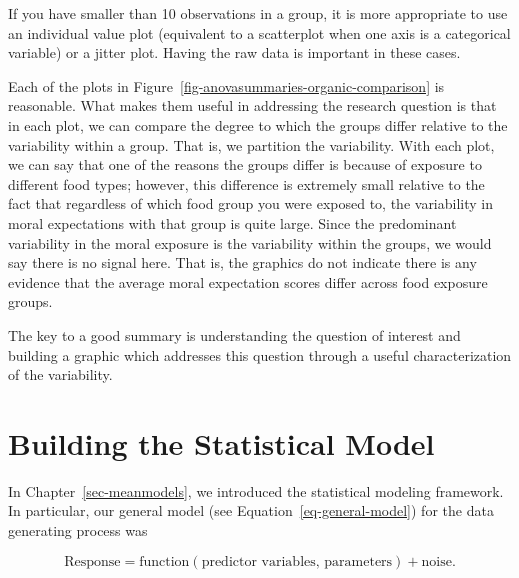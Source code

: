 \documentclass[
  letterpaper,
  DIV=11,
  numbers=noendperiod]{scrreprt}
\theoremstyle{definition}
\theoremstyle{definition}
\theoremstyle{plain}
\theoremstyle{remark}
\begin{document}
\begin{tcolorbox}[enhanced jigsaw, colbacktitle=quarto-callout-warning-color!10!white, colback=white, left=2mm, title=\textcolor{quarto-callout-warning-color}{\faExclamationTriangle}\hspace{0.5em}{Warning}, toptitle=1mm, leftrule=.75mm, breakable, bottomrule=.15mm, arc=.35mm, rightrule=.15mm, toprule=.15mm, coltitle=black, opacityback=0, colframe=quarto-callout-warning-color-frame, opacitybacktitle=0.6, bottomtitle=1mm, titlerule=0mm]

If you have smaller than 10 observations in a group, it is more
appropriate to use an individual value plot (equivalent to a scatterplot
when one axis is a categorical variable) or a jitter plot. Having the
raw data is important in these cases.

\end{tcolorbox}

Each of the plots in Figure~\ref{fig-anovasummaries-organic-comparison}
is reasonable. What makes them useful in addressing the research
question is that in each plot, we can compare the degree to which the
groups differ relative to the variability within a group. That is, we
partition the variability. With each plot, we can say that one of the
reasons the groups differ is because of exposure to different food
types; however, this difference is extremely small relative to the fact
that regardless of which food group you were exposed to, the variability
in moral expectations with that group is quite large. Since the
predominant variability in the moral exposure is the variability within
the groups, we would say there is no signal here. That is, the graphics
do not indicate there is any evidence that the average moral expectation
scores differ across food exposure groups.

The key to a good summary is understanding the question of interest and
building a graphic which addresses this question through a useful
characterization of the variability.

\chapter{Building the Statistical Model}\label{sec-anovamodel}

In Chapter~\ref{sec-meanmodels}, we introduced the statistical modeling
framework. In particular, our general model (see
Equation~\ref{eq-general-model}) for the data generating process was

\[\text{Response} = \text{function}(\text{predictor variables, parameters}) + \text{noise}.\]
\end{document}
